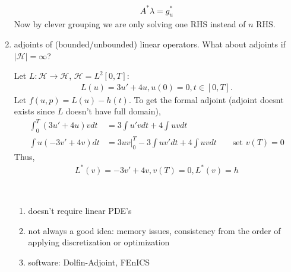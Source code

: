 \documentclass[class=article,crop=false]{standalone}
\begin{document}
\begin{enumerate}[label=(\arabic*)]
\begin{eg}
			\begin{align*}
				A^* \lambda = g_u^* 
			\end{align*}
			Now by clever grouping we are only solving one RHS instead of $ n$ RHS.
		\end{eg}
	\item adjoints of (bounded/unbounded) linear operators.
		What about adjoints if $ | \mathcal{ H}| = \infty$?
		\begin{eg}
			Let $ L : \mathcal{ H} \to \mathcal{ H}$, $ \mathcal{ H} = L^2[0,T]$:
		\begin{align*}
			L(u) = 3u'+4u,u(0)=0, t \in [0,T].
		\end{align*}
		Let $ f(u,p) = L(u) -h(t)$. To get the formal adjoint (adjoint doesnt exists since $ L$ doesn't have full domain),
		 \begin{align*}
			 \int_0^T (3u'+4u) v dt &= 3\int u'vdt + 4\int uv dt\\
			 \int u(-3v'+ 4v) dt&= 3uv\big|_0^T - 3\int uv' dt + 4 \int uv dt && \text{ set }  v(T)=0
		\end{align*}
		Thus,
		\begin{align*}
			L^* (v) = -3v'+4v, v(T)=0, L^* (v) = h
		\end{align*}
		\end{eg}
		\begin{remark}
		~\begin{enumerate}[label=(\arabic*)]
			\item doesn't require linear PDE's
			\item not always a good idea: memory issues, consistency from the order of applying discretization or optimization
			\item software: Dolfin-Adjoint, FEnICS
		\end{enumerate}
		\end{remark}
\end{enumerate}
\end{document}
